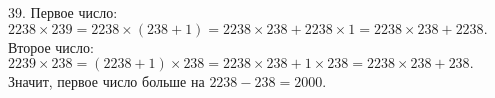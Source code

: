 39. Первое число:$2238\times239=2238\times(238+1)=2238\times238+2238\times1=2238\times238+2238.$ Второе число: $2239\times238=(2238+1)\times238=
2238\times238+1\times238=2238\times238+238.$ Значит, первое число больше на $2238-238=2000.$\\
